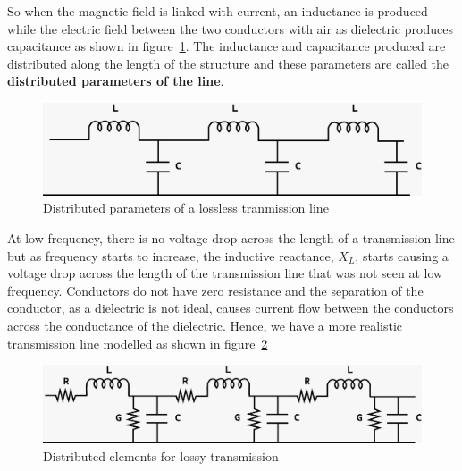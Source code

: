 So when the magnetic field is linked with current, an inductance is produced while the electric field between the two conductors with air as dielectric produces capacitance as shown in figure~\ref{fig:lossless-Tx}. The inductance and capacitance produced are distributed along the length of the structure and these parameters are called the \textbf{distributed parameters of the line}.
\begin{figure}[h]
\centering
\includegraphics[width=1\linewidth]{./graphics/losslessTx}
\caption{Distributed parameters of a lossless tranmission line}
\label{fig:lossless-Tx}
\end{figure}

At low frequency, there is no voltage drop across the length of a transmission line but as frequency starts to increase, the inductive reactance, $X_{L}$, starts causing a voltage drop across the length of the transmission line that was not seen at low frequency. Conductors do not have zero resistance and the separation of the conductor, as a dielectric is not ideal, causes current flow between the conductors across the conductance of the dielectric. Hence, we have a more realistic transmission line modelled as shown in figure~\ref{fig:sixth}
\begin{figure}[h]
\centering
\includegraphics[width=1\linewidth]{./graphics/lossyTx}
\caption{Distributed elements for lossy transmission}
\label{fig:sixth}
\end{figure}


